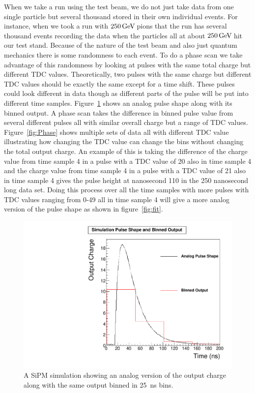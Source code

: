 When we take a run using the test beam, we do not just take data from one single particle but several thousand stored in their own individual events. For instance, when we took a run with $250{\,\text{Ge\hspace{-.08em}V\hspace{-0.16em}}}$ pions that the run has several thousand events recording the data when the particles all at about $250{\,\text{Ge\hspace{-.08em}V\hspace{-0.16em}}}$ hit our test stand. Because of the nature of the test beam and also just quantum mechanics there is some randomness to each event. To do a phase scan we take advantage of this randomness by looking at pulses with the same total charge but different TDC values. Theoretically, two pulses with the same charge but different TDC values should be exactly the same except for a time shift. These pulses could look different in data though as different parts of the pulse will be put into different time samples. Figure~\ref{fig:bin} shows an analog pulse shape along with its binned output. A phase scan takes the difference in binned pulse value from several different pulses all with similar overall charge but a range of TDC values. Figure~\ref{fig:Phase} shows multiple sets of data all with different TDC value illustrating how changing the TDC value can change the bins without changing the total output charge. An example of this is taking the difference of the charge value from time sample 4 in a pulse with a TDC value of 20 also in time sample 4 and the charge value from time sample 4 in a pulse with a TDC value of 21 also in time sample 4 gives the pulse height at nanosecond 110 in the 250 nanosecond long data set. Doing this process over all the time samples with more pulses with TDC values ranging from 0-49 all in time sample 4 will give a more analog version of the pulse shape as shown in figure~\ref{fig:fit}.

\begin{figure}
\centering
\includegraphics[width=0.6\linewidth]{Figures/Bin.pdf}
\caption{A SiPM simulation showing an analog version of the output charge along with the same output binned in 25~ns bins.}
\label{fig:bin}
\end{figure}

